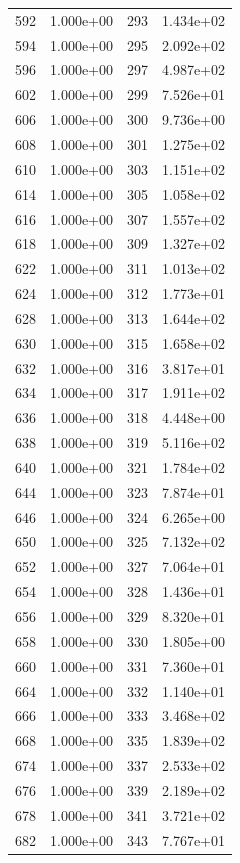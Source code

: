\documentclass[12pt]{article}
\begin{document}
\begin{longtable}{@{}cccc@{}}
592 & 1.000e+00 & 293 & 1.434e+02 \\
594 & 1.000e+00 & 295 & 2.092e+02 \\
596 & 1.000e+00 & 297 & 4.987e+02 \\
602 & 1.000e+00 & 299 & 7.526e+01 \\
606 & 1.000e+00 & 300 & 9.736e+00 \\
608 & 1.000e+00 & 301 & 1.275e+02 \\
610 & 1.000e+00 & 303 & 1.151e+02 \\
614 & 1.000e+00 & 305 & 1.058e+02 \\
616 & 1.000e+00 & 307 & 1.557e+02 \\
618 & 1.000e+00 & 309 & 1.327e+02 \\
622 & 1.000e+00 & 311 & 1.013e+02 \\
624 & 1.000e+00 & 312 & 1.773e+01 \\
628 & 1.000e+00 & 313 & 1.644e+02 \\
630 & 1.000e+00 & 315 & 1.658e+02 \\
632 & 1.000e+00 & 316 & 3.817e+01 \\
634 & 1.000e+00 & 317 & 1.911e+02 \\
636 & 1.000e+00 & 318 & 4.448e+00 \\
638 & 1.000e+00 & 319 & 5.116e+02 \\
640 & 1.000e+00 & 321 & 1.784e+02 \\
644 & 1.000e+00 & 323 & 7.874e+01 \\
646 & 1.000e+00 & 324 & 6.265e+00 \\
650 & 1.000e+00 & 325 & 7.132e+02 \\
652 & 1.000e+00 & 327 & 7.064e+01 \\
654 & 1.000e+00 & 328 & 1.436e+01 \\
656 & 1.000e+00 & 329 & 8.320e+01 \\
658 & 1.000e+00 & 330 & 1.805e+00 \\
660 & 1.000e+00 & 331 & 7.360e+01 \\
664 & 1.000e+00 & 332 & 1.140e+01 \\
666 & 1.000e+00 & 333 & 3.468e+02 \\
668 & 1.000e+00 & 335 & 1.839e+02 \\
674 & 1.000e+00 & 337 & 2.533e+02 \\
676 & 1.000e+00 & 339 & 2.189e+02 \\
678 & 1.000e+00 & 341 & 3.721e+02 \\
682 & 1.000e+00 & 343 & 7.767e+01 \\

\end{longtable}
\end{document}
